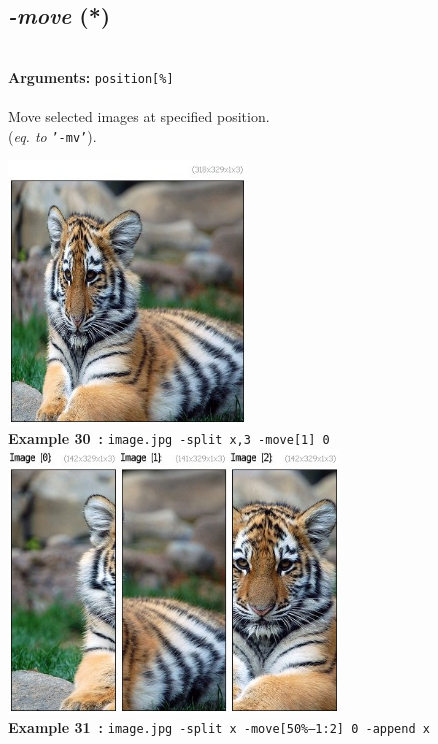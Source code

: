 \documentclass[a4paper,11pt,twoside]{book}
\begin{document}
\subsection{\emph{-move} (*)}\vspace*{-0.5em}
~\\\textbf{Arguments: } 
{\small \texttt{position[\%]}}\\~\\
Move selected images at specified position.
~\\(\emph{eq. to} {\small \texttt{'-mv'}}).
\begin{center}\includegraphics[keepaspectratio=true,height=7cm,width=\textwidth]{img/gmic_def30.jpg}\\
{\footnotesize \textbf{Example 30~:} \texttt{image.jpg -split x,3 -move[1] 0}}
\\\includegraphics[keepaspectratio=true,height=7cm,width=\textwidth]{img/gmic_def31.jpg}\\
{\footnotesize \textbf{Example 31~:} \texttt{image.jpg -split x -move[50\%--1:2] 0 -append x}}
\end{center}
\end{document}
